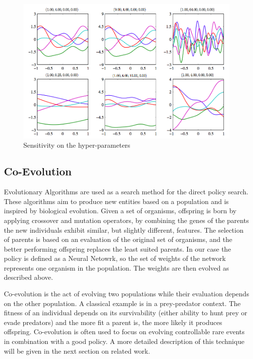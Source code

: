 \begin{figure}[ht]
  \centering
  \includegraphics[scale=0.5]{images/gp.png}
  \caption{Sensitivity on the hyper-parameters \cite{bishop2006pattern}}\label{gp}
\end{figure}

\subsection{Co-Evolution}
Evolutionary Algorithms are used as a search method for the direct policy search. These algorithms aim to produce new entities based on a population and is inspired by biological evolution. Given a set of organisms, offspring is born by applying crossover and mutation operators, by combining the genes of the parents the new individuals exhibit similar, but slightly different, features. The selection of parents is based on an evaluation of the original set of organisms, and the better performing offspring replaces the least suited parents. In our case the policy is defined as a Neural Netowrk, so the set of weights of the network represents one organism in the population. The weights are then evolved as described above.

Co-evolution is the act of evolving two populations while their evaluation depends on the other population. A classical example is in a prey-predator context. The fitness of an individual depends on its survivability (either ability to hunt prey or evade predators) and the more fit a parent is, the more likely it produces offspring. Co-evolution is often used to focus on evolving controllable rare events in combination with a good policy. A more detailed description of this technique will be given in the next section on related work.

